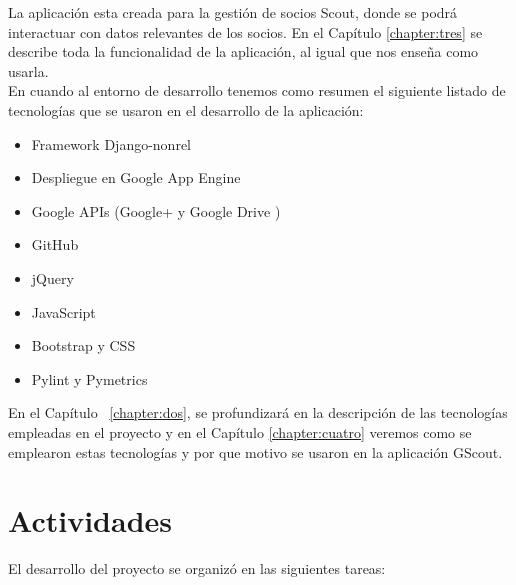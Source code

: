La aplicación esta creada para la gestión de socios Scout, donde se podrá interactuar con datos relevantes de los socios. En el Capítulo \ref{chapter:tres}
se describe toda la funcionalidad de la aplicación, al igual que nos enseña como usarla.\\

En cuando al entorno de desarrollo tenemos como resumen el siguiente listado de tecnologías que se usaron en el desarrollo de la aplicación:\\

\begin{itemize}
  \item Framework Django-nonrel \cite{URL:DjangoNonrel}
  \item Despliegue en Google App Engine \cite{URL:GAE}
  \item Google APIs (Google+ \cite{URL:GooglePlus} y Google Drive \cite{URL:GoogleDrive}) 
  \item GitHub \cite{URL:GitHub}
  \item jQuery \cite{URL:jQuery}
  \item JavaScript \cite{URL:JavaScript}
  \item Bootstrap \cite{URL:Bootstrap} y CSS \cite{URL:CSS}
  \item Pylint \cite{URL:Pylint} y Pymetrics \cite{URL:Pymetrics}
  
\end{itemize}
En el Capítulo ~\ref{chapter:dos}, se profundizará en la descripción de las tecnologías empleadas en el proyecto y en el Capítulo \ref{chapter:cuatro} 
veremos como se emplearon estas tecnologías y por que motivo se usaron en la aplicación GScout.\\

\section{Actividades}
\label{1:sec:3}
El desarrollo del proyecto se organizó en las siguientes tareas:


